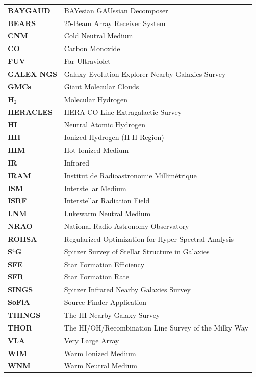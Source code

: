 \begingroup
\renewcommand{\arraystretch}{1.1}
\begin{table}[H]
	\centering
	\begin{tabular}{>{\bfseries}ll}
		\hline\hline

BAYGAUD & BAYesian GAUssian Decomposer\\
BEARS & 25-Beam Array Receiver System\\
CNM & Cold Neutral Medium\\
CO & Carbon Monoxide\\
FUV & Far-Ultraviolet\\
GALEX NGS & Galaxy Evolution Explorer Nearby Galaxies Survey\\
GMCs & Giant Molecular Clouds\\

H$_2$ & Molecular Hydrogen\\
HERACLES & HERA CO-Line Extragalactic Survey\\
HI & Neutral Atomic Hydrogen\\
HII & Ionized Hydrogen (H II Region)\\
HIM & Hot Ionized Medium\\
IR & Infrared\\
IRAM & Institut de Radioastronomie Millimétrique\\
ISM & Interstellar Medium\\
ISRF & Interstellar Radiation Field\\

LNM & Lukewarm Neutral Medium\\
NRAO & National Radio Astronomy Observatory\\
ROHSA & Regularized Optimization for Hyper-Spectral Analysis\\
S$^4$G & Spitzer Survey of Stellar Structure in Galaxies\\
SFE & Star Formation Efficiency\\
SFR & Star Formation Rate\\
SINGS & Spitzer Infrared Nearby Galaxies Survey\\
SoFiA & Source Finder Application\\
THINGS & The HI Nearby Galaxy Survey\\
THOR & The HI/OH/Recombination Line Survey of the Milky Way\\

VLA & Very Large Array\\
WIM & Warm Ionized Medium\\
WNM & Warm Neutral Medium\\

\hline\hline
	\end{tabular}
\end{table}
\endgroup
\newpage


